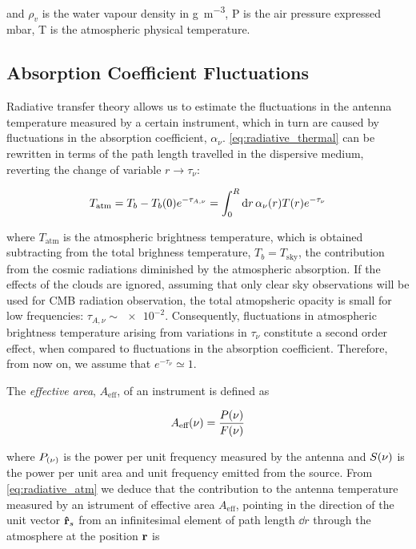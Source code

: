 and $\rho_v$ is the water vapour density in \si{\gram\per\cubic\meter}, P
is the air pressure expressed \si{\milli\bar}, T is the atmospheric physical
temperature.

\subsection{Absorption Coefficient Fluctuations}

Radiative transfer theory allows us to estimate the fluctuations
in the antenna temperature measured by a certain instrument, which in turn
are caused by fluctuations in the absorption coefficient, $\alpha_\nu$.
\autoref{eq:radiative_thermal} can be rewritten in terms of the path length
travelled in the dispersive medium, reverting the change of variable $r
\rightarrow \tau_\nu$:

\begin{equation}
        T_\text{atm} = T_b - T_b\qty(0) e^{-\tau_{A,\nu}} =
        \int^R_0 \dd{r} \alpha_\nu\qty(r) T\qty(r) e^{-\tau_\nu}
        \label{eq:radiative_atm}
\end{equation}

where $T_\text{atm}$ is the atmospheric brightness temperature, which is
obtained subtracting from the total brighness temperature, $T_b =
T_\text{sky}$, the contribution from the cosmic radiations diminished by
the atmospheric absorption. If the effects of the clouds are ignored,
assuming that only clear sky observations will be used for CMB radiation
observation, the total atmopsheric opacity is small for low frequencies:
$\tau_{A,\nu} \sim \num{e-2}$. Consequently, fluctuations in atmospheric
brightness temperature arising from variations in $\tau_\nu$ constitute a
second order effect, when compared to fluctuations in the absorption
coefficient. Therefore, from now on, we assume that $e^{-\tau_\nu} \simeq
1$.

The \emph{effective area}, $A_\text{eff}$, of an instrument is defined as

\begin{equation}
        A_\text{eff}\qty(\nu) = \frac{P\qty(\nu)}{F\qty(\nu)}
\end{equation}

where $P_\qty(\nu)$ is the power per unit frequency measured by the
antenna and $S\qty(\nu)$ is the power per unit area and unit frequency emitted
from the source.
From \autoref{eq:radiative_atm} we deduce that the contribution to the
antenna temperature measured by an istrument of effective area
$A_\text{eff}$, pointing in the direction of the unit vector $\vectorunit{r}_s$ from an infinitesimal
element of path length $\dd{r}$ through the atmosphere at the position $\vb{r}$ is

